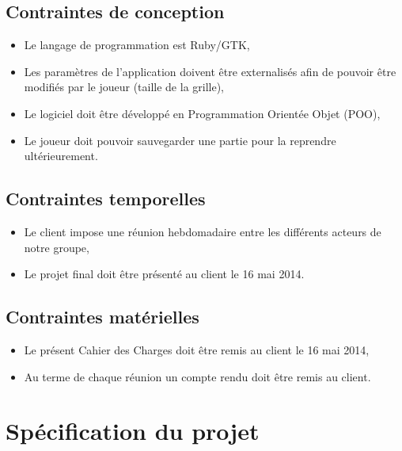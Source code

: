 \documentclass[11pt]{article}
\begin{document}
\subsection{Contraintes de conception}


\begin{itemize}
   \item Le langage de programmation est Ruby/GTK,
   \item Les paramètres de l’application doivent être externalisés afin de pouvoir être modifiés par le joueur (taille
       de la grille),
   \item Le logiciel doit être développé en Programmation Orientée Objet (POO),
   \item Le joueur doit pouvoir sauvegarder une partie pour la reprendre ultérieurement.
\end{itemize}




\subsection{Contraintes temporelles}


\begin{itemize}
    \item Le client impose une réunion hebdomadaire entre les différents acteurs de notre groupe,
    \item Le projet final doit être présenté au client le 16 mai 2014.
\end{itemize}




\subsection{Contraintes matérielles}


\begin{itemize}
    \item Le présent Cahier des Charges doit être remis au client le 16 mai 2014,
    \item Au terme de chaque réunion un compte rendu doit être remis au client.
\end{itemize}




\section{Spécification du projet}
\end{document}

